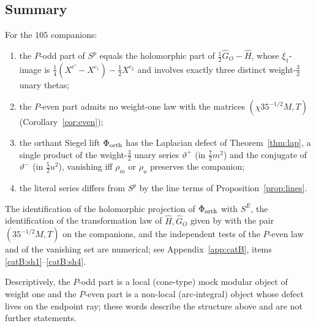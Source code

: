 \subsection{Summary}
\begin{theorem}\label{thm:hybrid}
For the $105$ companions:
\begin{enumerate}[label=(\roman*),leftmargin=2em]
\item the $P$-odd part of $S^p$ equals the holomorphic part of $\frac12\widehat G_O-\widehat H$, whose $\xi_1$-image is $\frac14(X^{c'}-X^{c_1})-\frac12X^{c_2}$ and involves exactly
three distinct weight-$\frac32$ unary thetas;
\item the $P$-even part admits no weight-one law with the matrices $(\chi35^{-1/2}M,T)$ (Corollary~\ref{cor:even});
\item the orthant Siegel lift $\Phi_{\rm orth}$ has the Laplacian defect of Theorem~\ref{thm:lap}, a single product of the weight-$\frac32$ unary series $\vartheta^+$
(in $\frac72m^2$) and the conjugate of $\vartheta^-$ (in $\frac52u^2$), vanishing iff $\rho_m$ or $\rho_u$ preserves the companion;
\item the literal series differs from $S^p$ by the line terms of Proposition~\ref{prop:lines}.
\end{enumerate}
\end{theorem}
\begin{catbremark}
The identification of the holomorphic projection of $\Phi_{\rm orth}$ with $S^E$, the identification of the transformation law of $\widehat H,\widehat G_O$ given by
\cite[Cor.~2.9]{Zw} with the pair $(35^{-1/2}M,T)$ on the companions, and the independent tests of the $P$-even law and of the vanishing set are numerical; see
Appendix~\ref{app:catB}, items \ref{catB:sh1}--\ref{catB:sh4}.
\end{catbremark}
\begin{remark}
Descriptively, the $P$-odd part is a local (cone-type) mock modular object of weight one and the $P$-even part is a non-local (arc-integral) object whose defect lives on the
endpoint ray; these words describe the structure above and are not further statements.
\end{remark}
